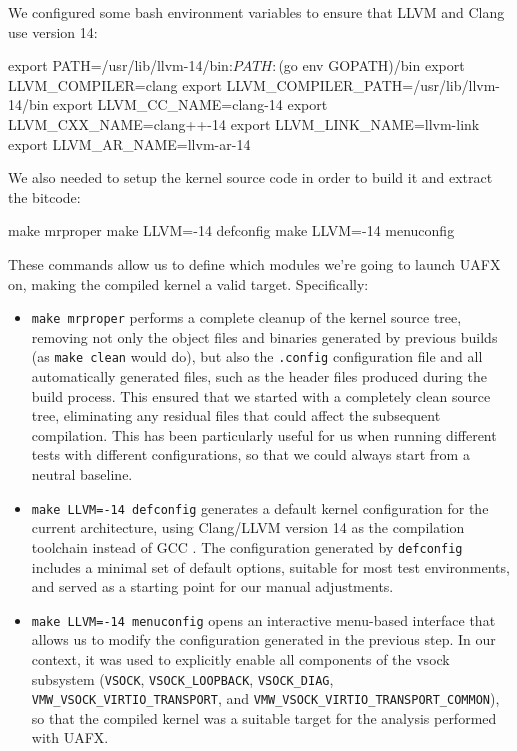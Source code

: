 We configured some bash environment variables to ensure that LLVM and Clang use version 14:

\begin{bashlncode}
    export PATH=/usr/lib/llvm-14/bin:$PATH:$(go env GOPATH)/bin
    export LLVM_COMPILER=clang
    export LLVM_COMPILER_PATH=/usr/lib/llvm-14/bin
    export LLVM_CC_NAME=clang-14
    export LLVM_CXX_NAME=clang++-14
    export LLVM_LINK_NAME=llvm-link
    export LLVM_AR_NAME=llvm-ar-14
\end{bashlncode}

\noindent We also needed to setup the kernel source code in order to build it and extract the bitcode:

\begin{bashlncode}
    make mrproper
    make LLVM=-14 defconfig
    make LLVM=-14 menuconfig
\end{bashlncode}

\noindent These commands allow us to define which modules we're going to launch UAFX on, making the compiled kernel a valid target. Specifically:
\begin{itemize}
    \item \texttt{make mrproper} performs a complete cleanup of the kernel source tree, removing not only the object files and binaries generated by previous builds (as \texttt{make clean} would do), but also the \texttt{.config} configuration file and all automatically generated files, such as the header files produced during the build process. This ensured that we started with a completely clean source tree, eliminating any residual files that could affect the subsequent compilation. This has been particularly useful for us when running different tests with different configurations, so that we could always start from a neutral baseline.

    \item \texttt{make LLVM=-14 defconfig} generates a default kernel configuration for the current architecture, using Clang/LLVM version 14 as the compilation toolchain instead of GCC \cite{bib:gcc}. The configuration generated by \texttt{defconfig} includes a minimal set of default options, suitable for most test environments, and served as a starting point for our manual adjustments.

    \item \texttt{make LLVM=-14 menuconfig} opens an interactive menu-based interface that allows us to modify the configuration generated in the previous step. In our context, it was used to explicitly enable all components of the vsock subsystem (\texttt{VSOCK}, \texttt{VSOCK\_LOOPBACK}, \texttt{VSOCK\_DIAG}, \texttt{VMW\_VSOCK\_VIRTIO\_TRANSPORT}, and \texttt{VMW\_VSOCK\_VIRTIO\_TRANSPORT\_COMMON}), so that the compiled kernel was a suitable target for the analysis performed with UAFX.
\end{itemize}

